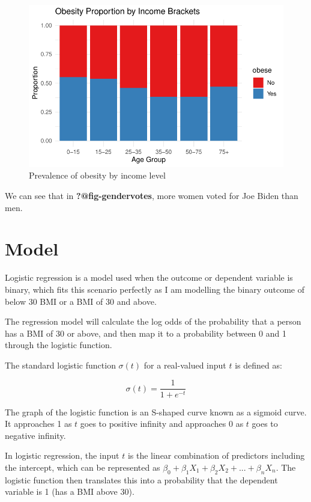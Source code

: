 \documentclass[
  letterpaper,
  DIV=11,
  numbers=noendperiod]{scrartcl}
\begin{document}
\begin{figure}

{\centering \includegraphics[width=\textwidth,height=0.2\textheight]{paper_files/figure-pdf/fig-incomeobesity-1.pdf}

}

\caption{\label{fig-incomeobesity}Prevalence of obesity by income level}

\end{figure}

We can see that in \textbf{?@fig-gendervotes}, more women voted for Joe
Biden than men.

\hypertarget{model}{%
\section{Model}\label{model}}

Logistic regression is a model used when the outcome or dependent
variable is binary, which fits this scenario perfectly as I am modelling
the binary outcome of below 30 BMI or a BMI of 30 and above.

The regression model will calculate the log odds of the probability that
a person has a BMI of 30 or above, and then map it to a probability
between 0 and 1 through the logistic function.

The standard logistic function \(\sigma(t)\) for a real-valued input
\(t\) is defined as:

\[ \sigma(t) = \frac{1}{1 + e^{-t}} \]

The graph of the logistic function is an S-shaped curve known as a
sigmoid curve. It approaches 1 as \(t\) goes to positive infinity and
approaches 0 as \(t\) goes to negative infinity.

In logistic regression, the input \(t\) is the linear combination of
predictors including the intercept, which can be represented as
\(\beta_0 + \beta_1X_1 + \beta_2X_2 + ... + \beta_nX_n\). The logistic
function then translates this into a probability that the dependent
variable is 1 (has a BMI above 30).
\end{document}
